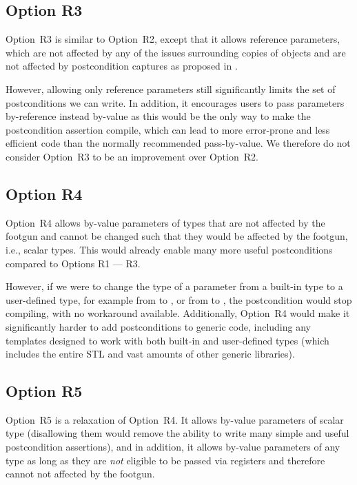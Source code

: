 \subsection*{Option R3}

Option~R3 is similar to Option~R2, except that it allows reference parameters, which are not affected by any of the issues surrounding copies of objects and are not affected by postcondition captures as proposed in \cite{P3098R0}.

However, allowing only reference parameters still significantly limits the set of postconditions we can write. In addition, it encourages users to pass parameters by-reference instead by-value as this would be the only way to make the postcondition assertion compile, which can lead to more error-prone and less efficient code than the normally recommended pass-by-value. We therefore do not consider Option~R3 to be an improvement over Option~R2.

\subsection*{Option R4}

Option~R4 allows by-value parameters of types that are not affected by the footgun and cannot be changed such that they would be affected by the footgun, i.e., scalar types. This would already enable many more useful postconditions compared to Options R1 --- R3.

However, if we were to change the type of a parameter from a built-in type to a user-defined type, for example from  to , or from  to , the postcondition would stop compiling, with no workaround available. Additionally,  Option~R4 would make it significantly harder to add postconditions to generic code, including any templates designed to work with both built-in and user-defined types (which includes the entire STL and vast amounts of other generic libraries).

\subsection*{Option R5}

Option~R5 is a relaxation of Option~R4. It allows by-value parameters of scalar type (disallowing them would remove the ability to write many simple and useful postcondition assertions), and in addition, it allows by-value parameters of any type as long as they are \emph{not} eligible to be passed via registers and therefore cannot not affected by the footgun.

